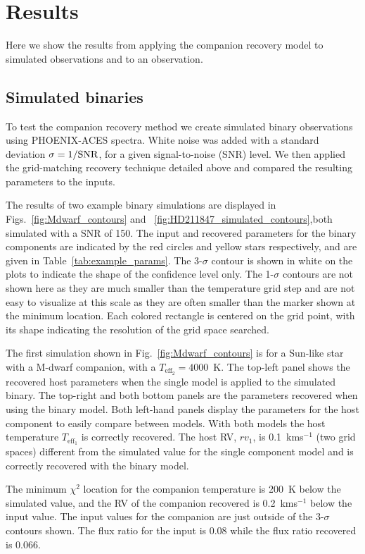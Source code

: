 \documentclass[fleqn,usenatbib]{mnras}
\begin{document}
\section{Results}
\label{sec:results}
Here we show the results from applying the companion recovery model to simulated observations and to an observation.


\subsection{Simulated binaries}
\label{subsec:simulated_binaries}
To test the companion recovery method we create simulated binary observations using PHOENIX-ACES spectra. White noise was added with a standard deviation \(\rm \sigma = 1/SNR\), for a given signal-to-noise (SNR) level. We then applied the grid-matching recovery technique detailed above and compared the resulting parameters to the inputs. 

The results of two example binary simulations are displayed in Figs.~\ref{fig:Mdwarf_contours} and ~\ref{fig:HD211847_simulated_contours},both simulated with a SNR of 150. The input and recovered parameters for the binary components are indicated by the red circles and yellow stars respectively, and are given in Table~\ref{tab:example_params}. 
The 3-\(\sigma\) contour is shown in white on the plots to indicate the shape of the confidence level only. The 1-\(\sigma\) contours are not shown here as they are much smaller than the temperature grid step and are not easy to visualize at this scale as they are often smaller than the marker shown at the minimum location. Each colored rectangle is centered on the grid point, with its shape indicating the resolution of the grid space searched.

The first simulation shown in Fig.~\ref{fig:Mdwarf_contours} is for a Sun-like star with a M-dwarf companion, with a \(T_{\textrm{eff}_2} =4000\)~K. The top-left panel shows the recovered host parameters when the single model is applied to the simulated binary. The top-right and both bottom panels are the parameters recovered when using the binary model. Both left-hand panels display the parameters for the host component to easily compare between models. With both models the host temperature \(T_{\textrm{eff}_1}\) is correctly recovered. The host RV, \({rv}_1\), is 0.1~kms\(^{-1}\) (two grid spaces) different from the simulated value for the single component model and is correctly recovered with the binary model.

The minimum \(\chi^2\) location for the companion temperature is 200~K below the simulated value, and the RV of the companion recovered is 0.2~kms\(^{-1}\) below the input value. The input values for the companion are just outside of the 3-\(\sigma\) contours shown. The flux ratio for the input is 0.08 while the flux ratio recovered is 0.066. 
\end{document}
